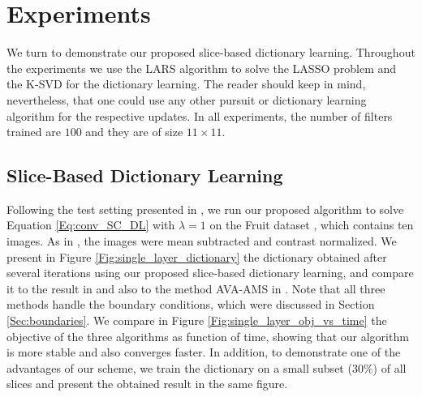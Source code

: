 \documentclass[10pt,twocolumn,letterpaper]{article}
\begin{document}
\section{Experiments} \label{Sec:experiments}
We turn to demonstrate our proposed slice-based dictionary learning. Throughout the experiments we use the LARS algorithm \cite{efron2004least} to solve the LASSO problem and the K-SVD \cite{aharon2006rm} for the dictionary learning. The reader should keep in mind, nevertheless, that one could use any other pursuit or dictionary learning algorithm for the respective updates. In all experiments, the number of filters trained are $100$ and they are of size $11 \times 11$.

\subsection{Slice-Based Dictionary Learning}
Following the test setting presented in \cite{Heide2015}, we run our proposed algorithm to solve Equation \eqref{Eq:conv_SC_DL} with $\lambda=1$ on the Fruit dataset \cite{zeiler2010deconvolutional}, which contains ten images. As in \cite{Heide2015}, the images were mean subtracted and contrast normalized. We present in Figure \ref{Fig:single_layer_dictionary} the dictionary obtained after several iterations using our proposed slice-based dictionary learning, and compare it to the result in \cite{Heide2015} and also to the method AVA-AMS in \cite{wohlberg2016boundary}. Note that all three methods handle the boundary conditions, which were discussed in Section \ref{Sec:boundaries}. We compare in Figure \ref{Fig:single_layer_obj_vs_time} the objective of the three algorithms as function of time, showing that our algorithm is more stable and also converges faster. In addition, to demonstrate one of the advantages of our scheme, we train the dictionary on a small subset ($30\%$) of all slices and present the obtained result in the same figure. 
\end{document}
